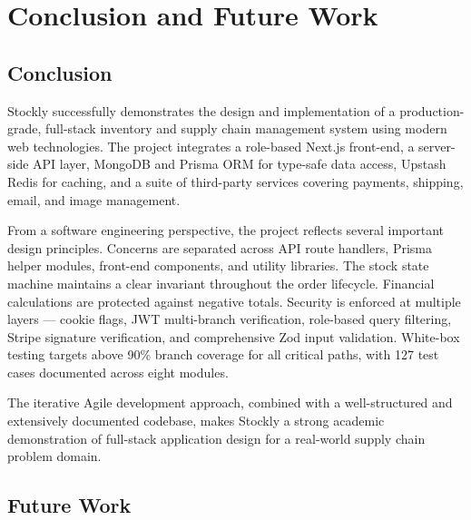 \documentclass[12pt,a4paper]{report}
\begin{document}
\chapter{Conclusion and Future Work}

\section{Conclusion}

Stockly successfully demonstrates the design and implementation of a production-grade, full-stack inventory and supply chain management system using modern web technologies. The project integrates a role-based Next.js front-end, a server-side API layer, MongoDB and Prisma ORM for type-safe data access, Upstash Redis for caching, and a suite of third-party services covering payments, shipping, email, and image management.

From a software engineering perspective, the project reflects several important design principles. Concerns are separated across API route handlers, Prisma helper modules, front-end components, and utility libraries. The stock state machine maintains a clear invariant throughout the order lifecycle. Financial calculations are protected against negative totals. Security is enforced at multiple layers --- cookie flags, JWT multi-branch verification, role-based query filtering, Stripe signature verification, and comprehensive Zod input validation. White-box testing targets above 90\% branch coverage for all critical paths, with 127 test cases documented across eight modules.

The iterative Agile development approach, combined with a well-structured and extensively documented codebase, makes Stockly a strong academic demonstration of full-stack application design for a real-world supply chain problem domain.

\section{Future Work}
\end{document}
